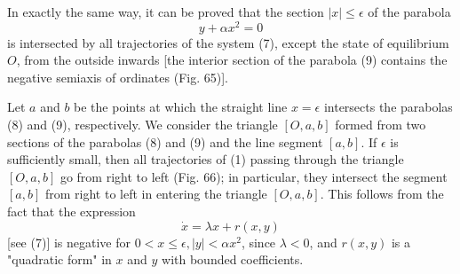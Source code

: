 \documentclass[10pt,a5paper]{book}
\makeatletter
\theoremstyle{plain}
\theoremstyle{definition}
\theoremstyle{remark}
\renewenvironment{proof}[1][\proofname]{\par
  \pushQED{\qed}%
  \normalfont\topsep6\p@\@plus6\p@\relax
  \trivlist
  \item\relax{\itshape #1\@addpunct{.}}\hspace\labelsep\ignorespaces
}{\popQED\endtrivlist\@endpefalse}
\makeatother
\begin{document}
\begin{proof}
In exactly the same way, it can be proved that the section $|x| \leq \epsilon$ of the parabola
\begin{equation*}
y+\alpha x^{2}=0 \tag{9}
\end{equation*}
is intersected by all trajectories of the system (7), except the state of equilibrium $O$, from the outside inwards [the interior section of the parabola (9) contains the negative semiaxis of ordinates (Fig. 65)].

Let $a$ and $b$ be the points at which the straight line $x=\epsilon$ intersects the parabolas (8) and (9), respectively. We consider the triangle $[O, a, b]$ formed from two sections of the parabolas (8) and (9) and the line segment $[a, b]$. If $\epsilon$ is sufficiently small, then all trajectories of (1) passing through the triangle $[O, a, b]$ go from right to left (Fig. 66); in particular, they intersect the segment $[a, b]$ from right to left in entering the triangle $[O, a, b]$. This follows from the fact that the expression
\[
\dot{x}=\lambda x+r(x, y)
\]
[see (7)] is negative for $0<x \leq \epsilon,|y|<\alpha x^{2}$, since $\lambda<0$, and $r(x, y)$ is a "quadratic form" in $x$ and $y$ with bounded coefficients.


\end{proof}
\end{document}
